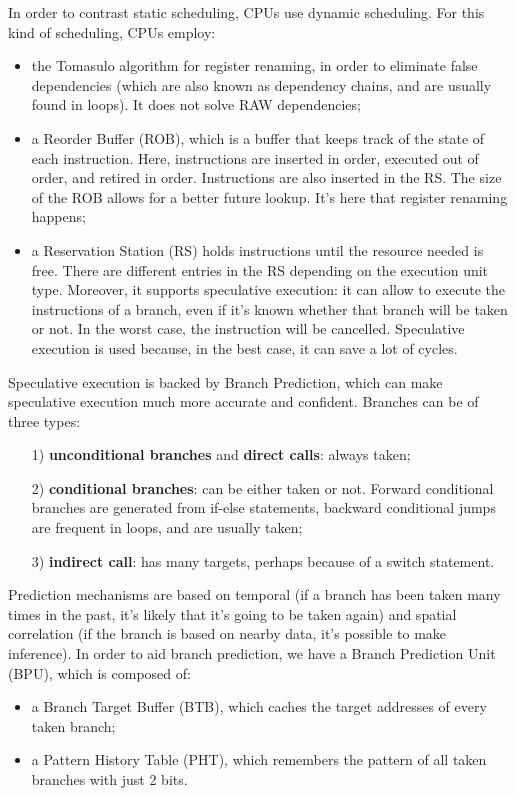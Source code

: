 In order to contrast static scheduling, CPUs use dynamic scheduling. For this kind of scheduling, CPUs employ:
\begin{itemize}
    \item the Tomasulo algorithm for register renaming, in order to eliminate false dependencies (which are also known as dependency chains, and are usually found in loops). It does not solve RAW dependencies;
    \item a Reorder Buffer (ROB), which is a buffer that keeps track of the state of each instruction. Here, instructions are inserted in order, executed out of order, and retired in order. Instructions are also inserted in the RS. The size of the ROB allows for a better future lookup. It's here that register renaming happens;
    \item a Reservation Station (RS) holds instructions until the resource needed is free. There are different entries in the RS depending on the execution unit type. Moreover, it supports speculative execution: it can allow to execute the instructions of a branch, even if it's known whether that branch will be taken or not. In the worst case, the instruction will be cancelled. Speculative execution is used because, in the best case, it can save a lot of cycles. 
\end{itemize}

Speculative execution is backed by Branch Prediction, which can make speculative execution much more accurate and confident. Branches can be of three types:
\begin{itemize}
    \item [1)] \textbf{unconditional branches} and \textbf{direct calls}: always taken;
    \item [2)] \textbf{conditional branches}: can be either taken or not. Forward conditional branches are generated from if-else statements, backward conditional jumps are frequent in loops, and are usually taken;
    \item [3)] \textbf{indirect call}: has many targets, perhaps because of a switch statement.
\end{itemize}

Prediction mechanisms are based on temporal (if a branch has been taken many times in the past, it's likely that it's going to be taken again) and spatial correlation (if the branch is based on nearby data, it's possible to make inference).
\nwl
In order to aid branch prediction, we have a Branch Prediction Unit (BPU), which is composed of:
\begin{itemize}
    \item a Branch Target Buffer (BTB), which caches the target addresses of every taken branch;
    \item a Pattern History Table (PHT), which remembers the pattern of all taken branches with just 2 bits. 
\end{itemize}

